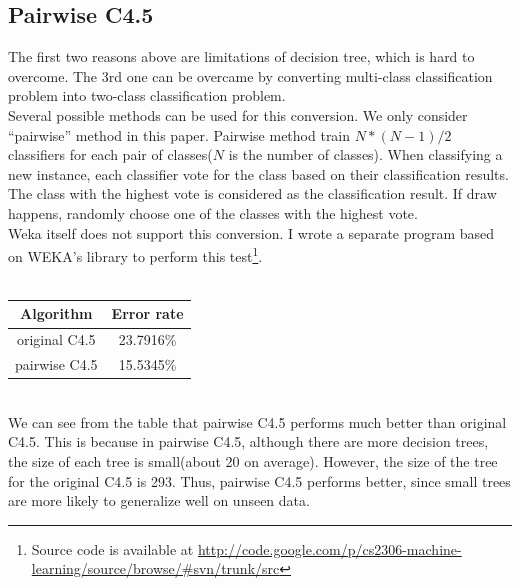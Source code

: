 \documentclass[a4paper,11pt]{article}
\begin{document}
\subsection{Pairwise C4.5}
The first two reasons above are limitations of decision tree, which is hard to overcome. The 3rd one can be overcame by converting multi-class classification problem into two-class classification problem.\\
Several possible methods can be used for this conversion. We only consider ``pairwise'' method in this paper. Pairwise method train $N*(N-1)/2$ classifiers for each pair of classes($N$ is the number of classes). When classifying a new instance, each classifier vote for the class based on their classification results. The class with the highest vote is considered as the classification result. If draw happens, randomly choose one of the classes with the highest vote.\\
Weka itself does not support this conversion. I wrote a separate program based on WEKA's library to perform this test\footnote{Source code is available at \url{http://code.google.com/p/cs2306-machine-learning/source/browse/#svn/trunk/src}}.\\
\vspace{0.5cm}\\
\begin{tabular}{c c}
Algorithm	& Error rate\\
\hline \hline
original C4.5	& 23.7916\%\\
pairwise C4.5	& 15.5345\%\\
\end{tabular}
\vspace{0.5cm}\\
We can see from the table that pairwise C4.5 performs much better than original C4.5. This is because in pairwise C4.5, although there are more decision trees, the size of each tree is small(about 20 on average). However, the size of the tree for the original C4.5 is 293. Thus, pairwise C4.5 performs better, since small trees are more likely to generalize well on unseen data.
\end{document}
